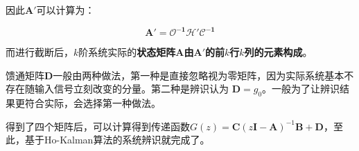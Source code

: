 因此\(\bm{A'}\)可以计算为：

\begin{equation*}
    \bm{A'}=\bm{\mathcal{O}^{-1}\mathcal{H'}\mathcal{C}^{-1}}
\end{equation*}

而进行截断后，\(k\)阶系统实际的\textbf{状态矩阵\(\bm{A}\)由\(\bm{A'}\)的前\(k\)行\(k\)列的元素构成}。

馈通矩阵\(\bm{D}\)一般由两种做法，第一种是直接忽略视为零矩阵，因为实际系统基本不存在随输入信号立刻改变的分量。第二种是辨识认为
\(\bm{D}=g_{0}\)。一般为了让辨识结果更符合实际，会选择第一种做法。

得到了四个矩阵后，可以计算得到传递函数\(G(z)=\bm{C}(z\bm{I}-\bm{A})^{-1}\bm{B}+\bm{D}\)，至此，基于Ho-Kalman算法的系统辨识就完成了。
